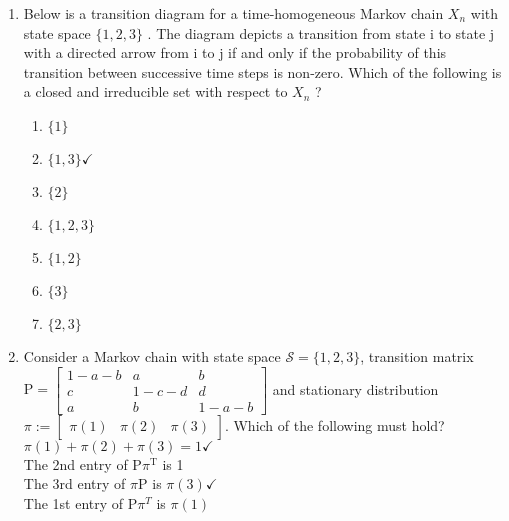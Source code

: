 \documentclass[10pt]{article}
\begin{document}
\begin{enumerate}
\item Below is a transition diagram for a time-homogeneous Markov chain 
  $X_n$ with state space  $\{1,2,3\}$
. The diagram depicts a transition from state i to state j with a directed arrow from i to j if and only if the probability of this transition between successive time steps is non-zero. Which of the following is a closed and irreducible set with respect to $X_n$ ?
\begin{enumerate}
  \item $\{1\}$
  \item $\{1,3\} \checkmark$
  \item $\{2\}$
  \item $\{1,2,3\}$
  \item $\{1,2\}$
  \item $\{3\}$
  \item $\{2,3\}$
\end{enumerate}

\item Consider a Markov chain with state space $\mathcal{S}=\{1,2,3\}$, transition matrix $\mathrm{P}=\left[\begin{array}{ccc}1-a-b & a & b \\ c & 1-c-d & d \\ a & b & 1-a-b\end{array}\right]$ and stationary distribution $\pi:=\left[\begin{array}{lll}\pi(1) & \pi(2) & \pi(3)\end{array}\right]$. Which of the following must hold?
$\pi(1)+\pi(2)+\pi(3)=1 \checkmark$ \\
The 2nd entry of $\mathrm{P} \pi^{\mathrm{T}}$ is 1 \\
The 3rd entry of $\pi \mathrm{P}$ is $\pi(3) \checkmark$ \\
The 1st entry of $\mathrm{P} \pi^T$ is $\pi(1)$
\end{enumerate}
\end{document}
